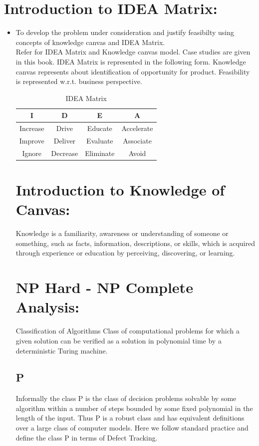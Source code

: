 \documentclass[a4paper,12pt]{report}
\begin{document}
\section{Introduction to IDEA Matrix:}
\begin{itemize}
\item To develop the problem under consideration and justify feasibilty using
concepts of knowledge canvas and IDEA Matrix.\\
Refer \cite{innovationbook} for IDEA Matrix and Knowledge canvas model. Case studies are given in this book. IDEA Matrix is represented in the following form. Knowledge canvas represents about identification  of opportunity for product. Feasibility is represented w.r.t. business perspective.\\ 

\begin{table}[!htbp]
\begin{center}
  \begin{tabular}{| c | c | c | c |}
\hline
 I & D & E & A \\ 
\hline
Increase & Drive & Educate & Accelerate \\
\hline
Improve & Deliver & Evaluate & Associate  \\
 \hline
Ignore & Decrease & Eliminate & Avoid \\
\hline
\end{tabular}
 \caption { IDEA Matrix }
 \label{tab:imatrix}
\end{center}
\end{table}
\section{Introduction to Knowledge of Canvas:}

Knowledge is a familiarity, awareness or understanding of someone or something,
such as facts, information, descriptions, or skills, which is acquired through
experience or education by perceiving, discovering, or learning.


\section {NP Hard - NP Complete Analysis:}
Classification of Algorithms
Class of computational problems for which a given solution can be verified as a solution in polynomial time by a deterministic Turing machine.
\subsection {P}
Informally the class P is the class of decision problems solvable by some algorithm within a number of steps bounded by some fixed polynomial in the length of the input.
Thus P is a robust class and has equivalent definitions over a large class of computer models. Here we follow standard practice and define the class P in terms of Defect Tracking.
	

\end{itemize}
\end{document}
